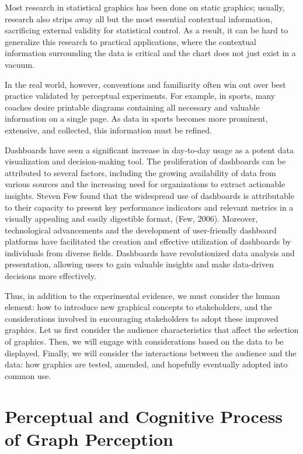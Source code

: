 \documentclass[print]{nuthesis}
\begin{document}
Most research in statistical graphics has been done on static graphics; usually, research also strips away all but the most essential contextual information, sacrificing external validity for statistical control.
As a result, it can be hard to generalize this research to practical applications, where the contextual information surrounding the data is critical and the chart does not just exist in a vacuum.

In the real world, however, conventions and familiarity often win out over best practice validated by perceptual experiments.
For example, in sports, many coaches desire printable diagrams containing all necessary and valuable information on a single page.
As data in sports becomes more prominent, extensive, and collected, this information must be refined.

Dashboards have seen a significant increase in day-to-day usage as a potent data visualization and decision-making tool.
The proliferation of dashboards can be attributed to several factors, including the growing availability of data from various sources and the increasing need for organizations to extract actionable insights.
Steven Few found that the widespread use of dashboards is attributable to their capacity to present key performance indicators and relevant metrics in a visually appealing and easily digestible format, (Few, 2006).
Moreover, technological advancements and the development of user-friendly dashboard platforms have facilitated the creation and effective utilization of dashboards by individuals from diverse fields.
Dashboards have revolutionized data analysis and presentation, allowing users to gain valuable insights and make data-driven decisions more effectively.

Thus, in addition to the experimental evidence, we must consider the human element: how to introduce new graphical concepts to stakeholders, and the considerations involved in encouraging stakeholders to adopt these improved graphics.
Let us first consider the audience characteristics that affect the selection of graphics.
Then, we will engage with considerations based on the data to be displayed.
Finally, we will consider the interactions between the audience and the data: how graphics are tested, amended, and hopefully eventually adopted into common use.

\hypertarget{perceptual-and-cognitive-process-of-graph-perception}{%
\section{Perceptual and Cognitive Process of Graph Perception}\label{perceptual-and-cognitive-process-of-graph-perception}}
\end{document}
